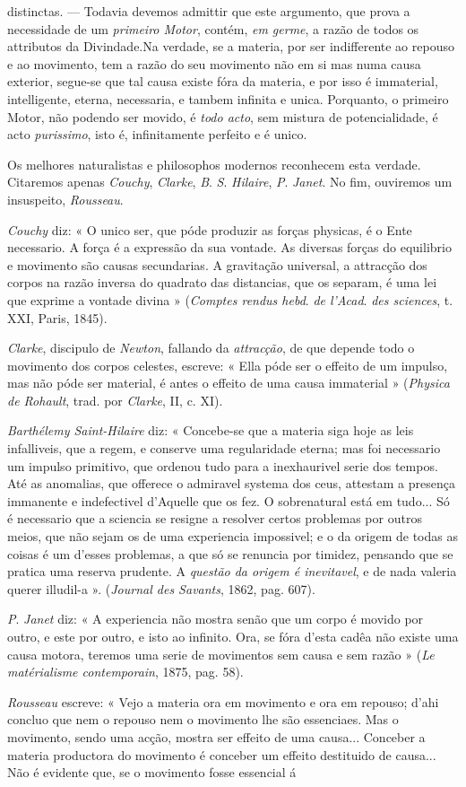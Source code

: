distinctas. --- Todavia devemos admittir que este argumento, que prova a necessidade de um \emph{primeiro Motor}, contém, \emph{em germe}, a razão de todos os attributos da Divindade.Na verdade, se a materia, por ser indifferente ao repouso e ao movimento, tem a razão do seu movimento não em si mas numa causa exterior, segue-se que tal causa existe fóra da materia, e por isso é immaterial, intelligente, eterna, necessaria, e tambem infinita e unica. Porquanto, o primeiro Motor, não podendo ser movido, é \emph{todo acto}, sem mistura de potencialidade, é acto \emph{purissimo}, isto é, infinitamente perfeito e é unico.\par Os melhores naturalistas e philosophos modernos reconhecem esta verdade. Citaremos apenas \emph{Couchy}, \emph{Clarke}, \emph{B}. \emph{S}. \emph{Hilaire}, \emph{P}. \emph{Janet}. No fim, ouviremos um insuspeito, \emph{Rousseau}.\par \emph{Couchy} diz: « O unico ser, que póde produzir as forças physicas, é o Ente necessario. A força é a expressão da sua vontade. As diversas forças do equilibrio e movimento são causas secundarias. A gravitação universal, a attracção dos corpos na razão inversa do quadrato das distancias, que os separam, é uma lei que exprime a vontade divina » (\emph{Comptes rendus hebd}. \emph{de l'Acad}. \emph{des sciences}, t. XXI, Paris, 1845).\par \emph{Clarke}, discipulo de \emph{Newton}, fallando da \emph{attracção}, de que depende todo o movimento dos corpos celestes, escreve: « Ella póde ser o effeito de um impulso, mas não póde ser material, é antes o effeito de uma causa immaterial » (\emph{Physica de Rohault}, trad. por \emph{Clarke}, II, c. XI).\par \emph{Barthélemy Saint-Hilaire} diz: « Concebe-se que a materia siga hoje as leis infalliveis, que a regem, e conserve uma regularidade eterna; mas foi necessario um impulso primitivo, que ordenou tudo para a inexhaurivel serie dos tempos. Até as anomalias, que offerece o admiravel systema dos ceus, attestam a presença immanente e indefectivel d'Aquelle que os fez. O sobrenatural está em tudo... Só é necessario que a sciencia se resigne a resolver certos problemas por outros meios, que não sejam os de uma experiencia impossivel; e o da origem de todas as coisas é um d'esses problemas, a que só se renuncia por timidez, pensando que se pratica uma reserva prudente. A \emph{questão da origem é inevitavel}, e de nada valeria querer illudil-a ». (\emph{Journal des Savants}, 1862, pag. 607).\par \emph{P}. \emph{Janet} diz: « A experiencia não mostra senão que um corpo é movido por outro, e este por outro, e isto ao infinito. Ora, se fóra d'esta cadêa não existe uma causa motora, teremos uma serie de movimentos sem causa e sem razão » (\emph{Le matérialisme contemporain}, 1875, pag. 58).\par \emph{Rousseau} escreve: « Vejo a materia ora em movimento e ora em repouso; d'ahi concluo que nem o repouso nem o movimento lhe são essenciaes. Mas o movimento, sendo uma acção, mostra ser effeito de uma causa... Conceber a materia productora do movimento é conceber um effeito destituido de causa... Não é evidente que, se o movimento fosse essencial á 